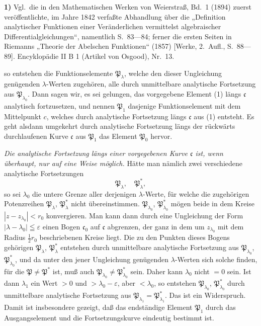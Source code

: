 \documentclass{article}
\begin{document}
\textbf{1)} Vgl.\ die in den Mathematischen Werken von Weierstraß, Bd.\ 1 (1894) zuerst veröffentlichte, im Jahre 1842 verfaßte Abhandlung über die „Definition analytischer Funktionen einer Veränderlichen vermittelst algebraischer Differentialgleichungen“, namentlich S.\ 83---84; ferner die ersten Seiten in Riemanns „Theorie der Abelschen Funktionen“ (1857) [Werke, 2.\ Aufl., S.\ 88---89]. Encyklopädie II B 1 (Artikel von Osgood), Nr.\ 13.

so entstehen die Funktionselemente $\mathfrak{P}_\lambda$, welche den dieser Ungleichung genügenden $\lambda$-Werten zugehören, alle durch unmittelbare analytische Fortsetzung aus $\mathfrak{P}_{\lambda_0}$. Dann sagen wir, es sei gelungen, das vorgegebene Element (1) längs $\mathfrak{c}$ analytisch fortzusetzen, und nennen $\mathfrak{P}_1$ dasjenige Funktionselement mit dem Mittelpunkt $c$, welches durch analytische Fortsetzung längs $\mathfrak{c}$ aus (1) entsteht. Es geht alsdann umgekehrt durch analytische Fortsetzung längs der rückwärts durchlaufenen Kurve $\mathfrak{c}$ aus $\mathfrak{P}_1$ das Element $\mathfrak{P}_0$ hervor.

\emph{Die analytische Fortsetzung längs einer vorgegebenen Kurve $\mathfrak{c}$ ist, wenn überhaupt, nur auf eine Weise möglich.} Hätte man nämlich zwei verschiedene analytische Fortsetzungen
\[ \mathfrak{P}_\lambda, \quad \mathfrak{P}_\lambda^*, \]
so sei $\lambda_0$ die untere Grenze aller derjenigen $\lambda$-Werte, für welche die zugehörigen Potenzreihen $\mathfrak{P}_\lambda$, $\mathfrak{P}_\lambda^*$ nicht übereinstimmen. $\mathfrak{P}_{\lambda_0}$, $\mathfrak{P}_{\lambda_0}^*$ mögen beide in dem Kreise $|z - z_{\lambda_0}| < r_0$ konvergieren. Man kann dann durch eine Ungleichung der Form $|\lambda - \lambda_0| \leqq \varepsilon$ einen Bogen $\mathfrak{c}_0$ auf $\mathfrak{c}$ abgrenzen, der ganz in dem um $z_{\lambda_0}$ mit dem Radius $\frac{1}{2}r_0$ beschriebenen Kreise liegt. Die zu den Punkten dieses Bogens gehörigen $\mathfrak{P}_\lambda$, $\mathfrak{P}_\lambda^*$ entstehen durch unmittelbare analytische Fortsetzung aus $\mathfrak{P}_{\lambda_0}$, $\mathfrak{P}_{\lambda_0}^*$, und da unter den jener Ungleichung genügenden $\lambda$-Werten sich solche finden, für die $\mathfrak{P} \neq \mathfrak{P}^*$ ist, muß auch $\mathfrak{P}_{\lambda_0} \neq \mathfrak{P}_{\lambda_0}^*$ sein. Daher kann $\lambda_0$ nicht $= 0$ sein. Ist dann $\lambda_1$ ein Wert $> 0$ und $> \lambda_0 - \varepsilon$, aber $< \lambda_0$, so entstehen $\mathfrak{P}_{\lambda_0}$, $\mathfrak{P}_{\lambda_0}^*$ durch unmittelbare analytische Fortsetzung aus $\mathfrak{P}_{\lambda_1} = \mathfrak{P}_{\lambda_1}^*$. Das ist ein Widerspruch. Damit ist insbesondere gezeigt, daß das endständige Element $\mathfrak{P}_1$ durch das Ausgangselement und die Fortsetzungskurve eindeutig bestimmt ist.
\end{document}
